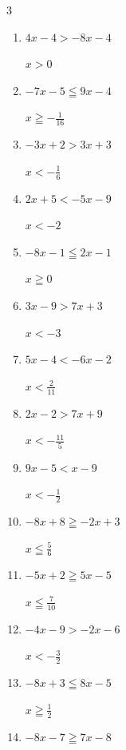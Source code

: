 \begin{multicols}{3}
\begin{enumerate}
        $\displaystyle x<-\frac{1}{9}$

  \item $4x-4>-8x-4$

        $\displaystyle x>0$

  \item $-7x-5\leqq 9x-4$

        $\displaystyle x\geqq -\frac{1}{16}$

  \item $-3x+2>3x+3$

        $\displaystyle x<-\frac{1}{6}$

  \item $2x+5<-5x-9$

        $\displaystyle x<-2$

  \item $-8x-1\leqq 2x-1$

        $\displaystyle x\geqq 0$

  \item $3x-9>7x+3$

        $\displaystyle x<-3$

  \item $5x-4<-6x-2$

        $\displaystyle x<\frac{2}{11}$

\columnbreak %

  \item $2x-2>7x+9$

        $\displaystyle x<-\frac{11}{5}$

  \item $9x-5<x-9$

        $\displaystyle x<-\frac{1}{2}$

  \item $-8x+8\geqq -2x+3$

        $\displaystyle x\leqq \frac{5}{6}$

  \item $-5x+2\geqq 5x-5$

        $\displaystyle x\leqq \frac{7}{10}$

  \item $-4x-9>-2x-6$

        $\displaystyle x<-\frac{3}{2}$

  \item $-8x+3\leqq 8x-5$

        $\displaystyle x\geqq \frac{1}{2}$

  \item $-8x-7\geqq 7x-8$


\end{enumerate}
\end{multicols}
